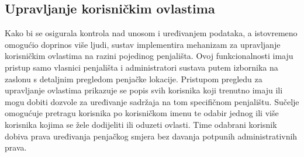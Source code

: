 \subsection{Upravljanje korisničkim ovlastima}

Kako bi se osigurala kontrola nad unosom i uređivanjem podataka, a istovremeno omogućio doprinos više ljudi, sustav implementira mehanizam za upravljanje korisničkim ovlastima na razini pojedinog penjališta. Ovoj funkcionalnosti imaju pristup samo vlasnici penjališta i administratori sustava putem izbornika na zaslonu s detaljnim pregledom penjačke lokacije. Pristupom pregledu za upravljanje ovlastima prikazuje se popis svih korisnika koji trenutno imaju ili mogu dobiti dozvole za uređivanje sadržaja na tom specifičnom penjalištu. Sučelje omogućuje pretragu korisnika po korisničkom imenu te odabir jednog ili više korisnika kojima se žele dodijeliti ili oduzeti ovlasti. Time odabrani korisnik dobiva prava uređivanja penjačkog smjera bez davanja potpunih administrativnih prava.

